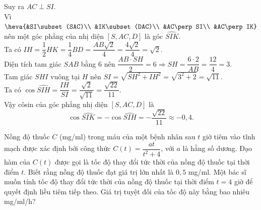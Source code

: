 \begin{ex}
{		Suy ra $AC\perp SI$.\\
		Vì $\heva{&SI\subset(SAC)\\ &IK\subset(DAC)\\ &AC\perp SI\\ &AC\perp IK}$ nên một góc phẳng của nhị diện $[S,AC,D]$ là góc $\widehat{SIK}$.\\
		Ta có $IH=\dfrac{1}{2}HK=\dfrac{1}{4}BD=\dfrac{AB\sqrt{2}}{4}=\dfrac{4\sqrt{2}}{4}=\sqrt{2}$.\\
		Diện tích tam giác $SAB$ bằng $6$ nên $\dfrac{AB\cdot SH}{2}=6\Rightarrow SH=\dfrac{6\cdot 2}{AB}=\dfrac{12}{4}=3$.\\
		Tam giác $SHI$ vuông tại $H$ nên $SI=\sqrt{SH^2+IH^2}=\sqrt{3^2+2}=\sqrt{11}$.\\
		Ta có $\cos\widehat{SIH}=\dfrac{IH}{SI}=\dfrac{\sqrt{2}}{\sqrt{11}}=\dfrac{\sqrt{22}}{11}$.\\
		Vậy côsin của góc phẳng nhị diện $[S,AC,D]$ là
		\[\cos\widehat{SIK}=-\cos\widehat{SIH}=-\dfrac{\sqrt{22}}{11}\approx -0{,}4.\]
	}
\end{ex}

\begin{ex}%
	Nồng độ thuốc $C$ (mg/ml) trong máu của một bệnh nhân sau $t$ giờ tiêm vào tĩnh mạch được xác định bởi công thức $C(t) = \dfrac{at}{t^2 + 4}$, với $a$ là hằng số dương. Đạo hàm của $C(t)$ được gọi là tốc độ thay đổi tức thời của nồng độ thuốc tại thời điểm $t$. Biết rằng nồng độ thuốc đạt giá trị lớn nhất là $0{,}5$ mg/ml. Một bác sĩ muốn tính tốc độ thay đổi tức thời của nồng độ thuốc tại thời điểm $t = 4$ giờ để quyết định liều tiêm tiếp theo. Giá trị tuyệt đối của tốc độ này bằng bao nhiêu mg/ml/h?
	\par{}
\end{ex}

